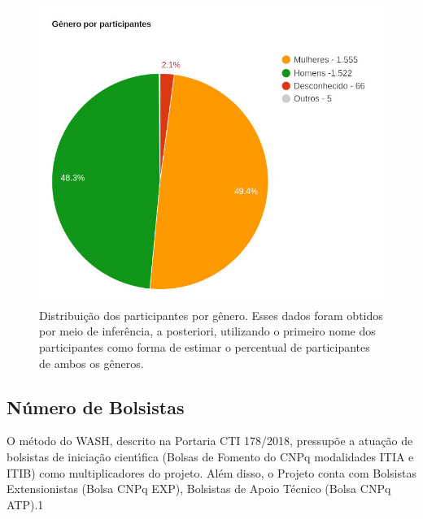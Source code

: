 \documentclass[
12pt,		%
openright,	%
twoside,  %
a4paper,			%
chapter=TITLE,		%
english,			%
french,				%
spanish,			%
brazil				%
]{USPSC-classe/USPSC}
\begin{document}
\captionsetup{format=plain}
\begin{figure}[max size={\textwidth}{\textheight}]

\centering


\begin{minipage}[b]{0.4\linewidth}
        \centering
                \includegraphics[width=1.0\linewidth]{../../imagens/genero-todos-crop.jpeg}
                \caption{Distribui\c{c}\~ao dos participantes por g\^enero. Esses dados foram obtidos por meio de infer\^encia, a posteriori, utilizando o primeiro nome dos participantes como forma de estimar o percentual de participantes de ambos os g\^eneros.}
                \label{ef11d820efb73d78fb64eb6bdd03853471a8e89f}
\end{minipage}%
\hspace{0.5cm}
\end{figure}



\subsection[N\'umero de Bolsistas]{N\'umero de Bolsistas}\label{N\'umero de Bolsistas}
O m\'etodo do WASH, descrito na Portaria CTI 178/2018, pressup\~oe a atua\c{c}\~ao de bolsistas de inicia\c{c}\~ao cient\'{\i}fica (Bolsas de Fomento do CNPq modalidades ITIA e ITIB) como multiplicadores do projeto. Al\'em disso, o Projeto conta com Bolsistas Extensionistas (Bolsa CNPq EXP), Bolsistas de Apoio T\'ecnico (Bolsa CNPq ATP).1
\end{document}
